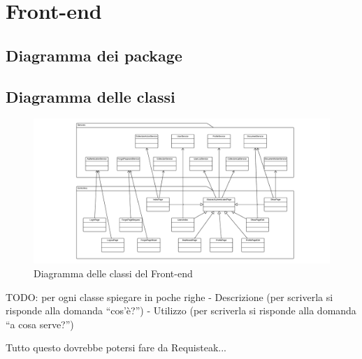 \section{Front-end}


\subsection{Diagramma dei package}


\subsection{Diagramma delle classi}

\begin{figure}[H]
\centering
\includegraphics[width=\textwidth]{uml/diagramma-classi-front-end.png}
\caption{Diagramma delle classi del Front-end}
\label{diagrammaClassiFrontEnd}
\end{figure}

TODO: per ogni classe spiegare in poche righe
- Descrizione (per scriverla si risponde alla domanda ``cos'è?'')
- Utilizzo (per scriverla si risponde alla domanda ``a cosa serve?'')

Tutto questo dovrebbe potersi fare da Requisteak...

